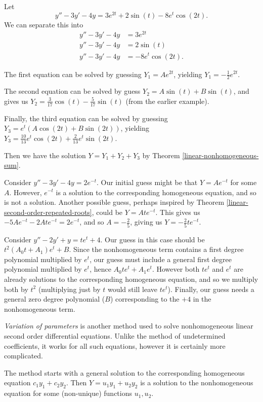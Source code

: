 \begin{exmp}
    Let \[y'' - 3y' - 4y = 3e^{2t} + 2\sin(t) - 8e^{t}\cos(2t).\]
    We can separate this into
    \begin{align*}
        y'' - 3y' - 4y &= 3e^{2t} \\
        y'' - 3y' - 4y &= 2\sin(t) \\
        y'' - 3y' - 4y &= -8e^{t}\cos(2t).
    \end{align*}

    The first equation can be solved by guessing $Y_1 = Ae^{2t}$, yielding $Y_1 = -\frac{1}{2}e^{2t}$.

    The second equation can be solved by guess $Y_2 = A\sin(t) + B\sin(t)$, and gives us $Y_2 = \frac{3}{17}\cos(t) - \frac{5}{17}\sin(t)$ (from the earlier example).

    Finally, the third equation can be solved by guessing $Y_3 = e^{t}(A\cos(2t) + B\sin(2t))$, yielding $Y_3 = \frac{10}{13}e^{t}\cos(2t) + \frac{2}{13}e^{t}\sin(2t)$.

    Then we have the solution $Y = Y_1 + Y_2 + Y_3$ by Theorem \ref{linear-nonhomogeneous-sum}.
\end{exmp}

\begin{exmp}
    Consider $y'' - 3y' - 4y = 2e^{-t}$. Our initial guess might be that $Y = Ae^{-t}$ for some $A$. However, $e^{-t}$ is a solution to the corresponding homogeneous equation, and so is not a solution. Another possible guess, perhaps inspired by Theorem \ref{linear-second-order-repeated-roots}, could be $Y = Ate^{-t}$. This gives us $-5Ae^{-t} - 2Ate^{-t} = 2e^{-t}$, and so $A = -\frac{2}{5}$, giving us $Y = -\frac{2}{5}te^{-t}$.
\end{exmp}

\begin{exmp}
    Consider $y'' - 2y' + y = te^t + 4$. Our guess in this case should be $t^2(A_0t + A_1)e^t + B$. Since the nonhomogeneous term contains a first degree polynomial multiplied by $e^t$, our guess must include a general first degree polynomial multiplied by $e^t$, hence $A_0te^t + A_1e^t$. However both $te^t$ and $e^t$ are already solutions to the corresponding homogeneous equation, and so we multiply both by $t^2$ (multiplying just by $t$ would still leave $te^t$). Finally, our guess needs a general zero degree polynomial ($B$) corresponding to the $+4$ in the nonhomogeneous term.
\end{exmp}

\begin{defn}
    \emph{Variation of parameters} is another method used to solve nonhomogeneous linear second order differential equations. Unlike the method of undetermined coefficients, it works for all such equations, however it is certainly more complicated.

    The method starts with a general solution to the corresponding homogeneous equation $c_1y_1 + c_2y_2$. Then $Y = u_1y_1 + u_2y_2$ is a solution to the nonhomogeneous equation for some (non-unique) functions $u_1, u_2$.
\end{defn}

